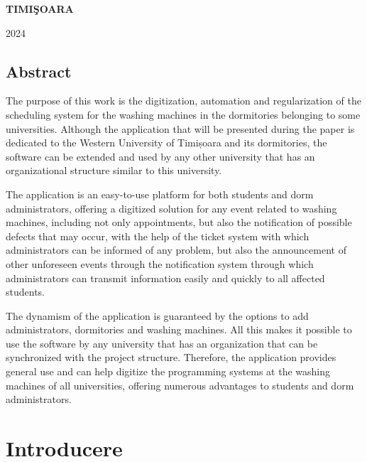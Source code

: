 \documentclass[12pt,a4paper]{report}
\theoremstyle{definition}
\theoremstyle{remark}
\begin{document}
\vfill
\begin{center}
    {\bf TIMI\c SOARA

        2024}
\end{center}
\newpage
\normalsize{}
\section*{Abstract}

\par The purpose of this work is the digitization, automation and regularization of the scheduling system for the washing machines in the dormitories belonging to some universities. Although the application that will be presented during the paper is dedicated to the Western University of Timișoara and its dormitories, the software can be extended and used by any other university that has an organizational structure similar to this university.
\vspace{1em}

\par The application is an easy-to-use platform for both students and dorm administrators, offering a digitized solution for any event related to washing machines, including not only appointments, but also the notification of possible defects that may occur, with the help of the ticket system with which administrators can be informed of any problem, but also the announcement of other unforeseen events through the notification system through which administrators can transmit information easily and quickly to all affected students.
\vspace{1em}

\par The dynamism of the application is guaranteed by the options to add administrators, dormitories and washing machines. All this makes it possible to use the software by any university that has an organization that can be synchronized with the project structure. Therefore, the application provides general use and can help digitize the programming systems at the washing machines of all universities, offering numerous advantages to students and dorm administrators.
\vspace{1em}

\tableofcontents
\newpage


\chapter{Introducere}
\end{document}
